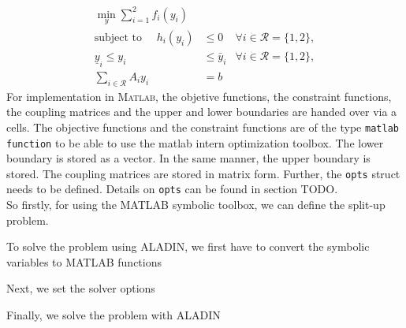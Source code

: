 \documentclass[]{scrartcl}
\begin{document}
\begin{subequations} \label{eq:sepForm_example}
    \begin{align} 
    \min_{y} \sum_{i=1}^2  f_i(y_i)& \\
    \text{subject to }\quad  h_i(y_i)&\leq 0&\forall i \in \mathcal{R} = \{1, 2\}, \label{sepFormInEq_example} \\
    \underline y_i \leq y_i& \leq \bar y_i &\forall i \in \mathcal{R} = \{1, 2\}, \label{sepFormBound_example}\\
    \sum_{i\in \mathcal{R}} A_i y_i&=b \label{eq:consConstr_example}
    \end{align}
\end{subequations}
For implementation in \textsc{Matlab}, the objetive functions, the constraint functions, the coupling matrices and the upper and lower boundaries are handed over via a cells. The objective functions and the constraint functions are of the type \texttt{matlab function} to be able to use the matlab intern optimization toolbox. The lower boundary is stored as a vector. In the same manner, the upper boundary is stored. The coupling matrices are stored in matrix form. Further, the \texttt{opts} struct needs to be defined. Details on \texttt{opts} can be found in section TODO.
\\So firstly, for using the MATLAB symbolic toolbox, we can define the split-up problem.

To solve the problem using ALADIN, we first have to convert the symbolic variables to MATLAB functions

Next, we set the solver options

Finally, we solve the problem with ALADIN

\end{document}

